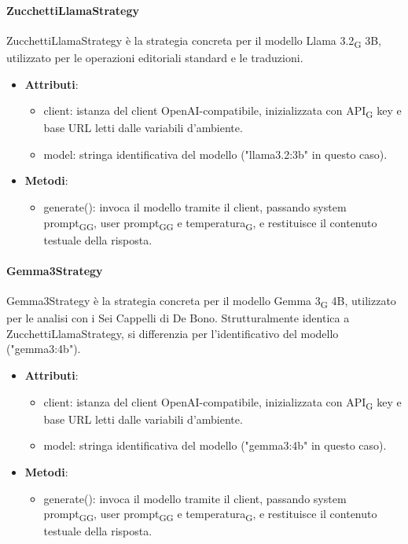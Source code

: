 \documentclass[11pt,a4paper]{article}
\newcommand{\gls}[1]{#1\textsubscript{G}}
\begin{document}
\paragraph{ZucchettiLlamaStrategy} 
ZucchettiLlamaStrategy è la strategia concreta per il modello \gls{Llama 3.2} 3B, utilizzato per le operazioni editoriali standard e le traduzioni.
\begin{itemize}

\item \textbf{Attributi}:

\begin{itemize}
\item client: istanza del client OpenAI-compatibile, inizializzata con \gls{API} key e base URL letti dalle variabili d'ambiente.
\item model: stringa identificativa del modello ("llama3.2:3b" in questo caso).
\end{itemize}

\item \textbf{Metodi}: 

\begin{itemize}
\item generate(): invoca il modello tramite il client, passando \gls{system \gls{prompt}}, \gls{user \gls{prompt}} e \gls{temperatura}, e restituisce il contenuto testuale della risposta.
\end{itemize}

\end{itemize}

\paragraph{Gemma3Strategy} 
Gemma3Strategy è la strategia concreta per il modello \gls{Gemma 3} 4B, utilizzato per le analisi con i Sei Cappelli di De Bono. Strutturalmente identica a ZucchettiLlamaStrategy, si differenzia per l'identificativo del modello ("gemma3:4b").
\begin{itemize}

\item \textbf{Attributi}:

\begin{itemize}
\item client: istanza del client OpenAI-compatibile, inizializzata con \gls{API} key e base URL letti dalle variabili d'ambiente.
\item model: stringa identificativa del modello ("gemma3:4b" in questo caso).
\end{itemize}

\item \textbf{Metodi}: 

\begin{itemize}
\item generate(): invoca il modello tramite il client, passando \gls{system \gls{prompt}}, \gls{user \gls{prompt}} e \gls{temperatura}, e restituisce il contenuto testuale della risposta.
\end{itemize}

\end{itemize}
\end{document}
